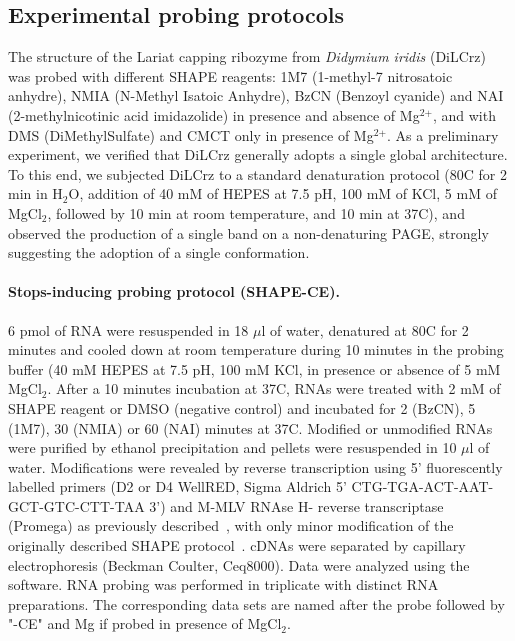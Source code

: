 \documentclass[a4,center,fleqn]{NAR}
\begin{document}
\subsection*{Experimental probing protocols}
The structure of the Lariat capping ribozyme from \textit{Didymium iridis }(DiLCrz) was probed with different SHAPE reagents: 1M7 (1-methyl-7 nitrosatoic anhydre), NMIA (N-Methyl Isatoic Anhydre), BzCN (Benzoyl cyanide) and NAI (2-methylnicotinic acid imidazolide) in presence and absence of Mg$^\text{2+}$, and with DMS (DiMethylSulfate) and CMCT only in presence of Mg$^\text{2+}$.
As a preliminary experiment, we verified that DiLCrz generally adopts a single global architecture. To this end, we subjected DiLCrz to a standard denaturation protocol (80\degree{}C for 2 min in H$_\text{2}$O, addition of 40 mM of HEPES at 7.5 pH, 100 mM of KCl, 5 mM of MgCl$_\text{2}$, followed by 10 min at room temperature, and 10 min at 37\degree{}C), and observed the production of a single band on a non-denaturing PAGE, strongly suggesting the adoption of a single conformation.

\paragraph{Stops-inducing probing protocol (SHAPE-CE).} 
6 pmol of RNA were resuspended in 18 $\mu$l of water, denatured at 80\degree{}C for 2 minutes and cooled down at room temperature during 10 minutes in the probing buffer (40 mM HEPES at 7.5 pH, 100 mM KCl, in presence or absence of 5 mM MgCl$_\text{2}$. After a 10 minutes incubation at 37\degree{}C, RNAs were treated with 2 mM of SHAPE reagent or DMSO (negative control) and incubated for 2 (BzCN), 5 (1M7), 30 (NMIA) or 60 (NAI) minutes at 37\degree{}C. Modified or unmodified RNAs were purified by ethanol precipitation and pellets were resuspended in 10 $\mu$l of water.
Modifications were revealed by reverse transcription using 5’ fluorescently labelled primers (D2 or D4 WellRED, Sigma Aldrich 5’ CTG-TGA-ACT-AAT-GCT-GTC-CTT-TAA 3’) and M-MLV RNAse H- reverse transcriptase (Promega) as previously described~\cite{Deforges2017}, with only minor modification of the originally described SHAPE protocol~\cite{Wilkinson2006}. cDNAs were separated by capillary electrophoresis (Beckman Coulter, Ceq8000). Data were analyzed using the  ~\cite{Karabiber2013} software. RNA probing was performed in triplicate with distinct RNA preparations. The corresponding data sets are named after the probe followed by "-CE" and Mg if probed in presence of MgCl$_\text{2}$.
\end{document}
